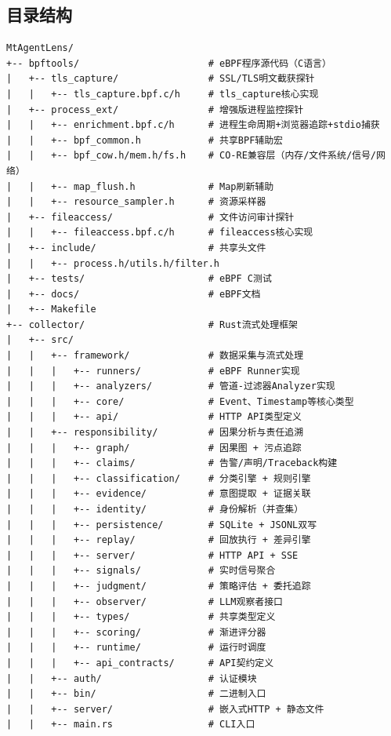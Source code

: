 \documentclass[a4paper]{ctexart}
\makeatletter
\renewcommand{\_}{%
  \ifmmode
    \nfss@text{\textunderscore}%
  \else
    \textunderscore\discretionary{}{}{}%
  \fi}
\makeatother
\begin{document}
\subsection{目录结构}



\begin{lstlisting}
MtAgentLens/
+-- bpftools/                       # eBPF程序源代码（C语言）
|   +-- tls_capture/                # SSL/TLS明文截获探针
|   |   +-- tls_capture.bpf.c/h     # tls_capture核心实现
|   +-- process_ext/                # 增强版进程监控探针
|   |   +-- enrichment.bpf.c/h      # 进程生命周期+浏览器追踪+stdio捕获
|   |   +-- bpf_common.h            # 共享BPF辅助宏
|   |   +-- bpf_cow.h/mem.h/fs.h    # CO-RE兼容层（内存/文件系统/信号/网络）
|   |   +-- map_flush.h             # Map刷新辅助
|   |   +-- resource_sampler.h      # 资源采样器
|   +-- fileaccess/                 # 文件访问审计探针
|   |   +-- fileaccess.bpf.c/h      # fileaccess核心实现
|   +-- include/                    # 共享头文件
|   |   +-- process.h/utils.h/filter.h
|   +-- tests/                      # eBPF C测试
|   +-- docs/                       # eBPF文档
|   +-- Makefile
+-- collector/                      # Rust流式处理框架
|   +-- src/
|   |   +-- framework/              # 数据采集与流式处理
|   |   |   +-- runners/            # eBPF Runner实现
|   |   |   +-- analyzers/          # 管道-过滤器Analyzer实现
|   |   |   +-- core/               # Event、Timestamp等核心类型
|   |   |   +-- api/                # HTTP API类型定义
|   |   +-- responsibility/         # 因果分析与责任追溯
|   |   |   +-- graph/              # 因果图 + 污点追踪
|   |   |   +-- claims/             # 告警/声明/Traceback构建
|   |   |   +-- classification/     # 分类引擎 + 规则引擎
|   |   |   +-- evidence/           # 意图提取 + 证据关联
|   |   |   +-- identity/           # 身份解析（并查集）
|   |   |   +-- persistence/        # SQLite + JSONL双写
|   |   |   +-- replay/             # 回放执行 + 差异引擎
|   |   |   +-- server/             # HTTP API + SSE
|   |   |   +-- signals/            # 实时信号聚合
|   |   |   +-- judgment/           # 策略评估 + 委托追踪
|   |   |   +-- observer/           # LLM观察者接口
|   |   |   +-- types/              # 共享类型定义
|   |   |   +-- scoring/            # 渐进评分器
|   |   |   +-- runtime/            # 运行时调度
|   |   |   +-- api_contracts/      # API契约定义
|   |   +-- auth/                   # 认证模块
|   |   +-- bin/                    # 二进制入口
|   |   +-- server/                 # 嵌入式HTTP + 静态文件
|   |   +-- main.rs                 # CLI入口

\end{lstlisting}
\end{document}
